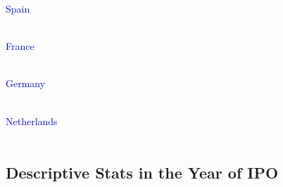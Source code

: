 \documentclass[12pt,notitlepage]{article}
\newcommand{\sym}[1] {\ifmmode^{#1} \else\(^{#1}\) \fi}
\begin{document}
\textcolor{blue}{Spain}\\~\

\begin{table}[htbp]\centering
\def\sym#1{\ifmmode^{#1}\else\(^{#1}\)\fi}
\caption{Haltiwanger growth rate}
\end{table}

\clearpage


\textcolor{blue}{France}\\~\

\begin{table}[htbp]\centering
\def\sym#1{\ifmmode^{#1}\else\(^{#1}\)\fi}
\caption{Haltiwanger growth rate}
\end{table}

\textcolor{blue}{Germany}\\~\

\begin{table}[htbp]\centering
\def\sym#1{\ifmmode^{#1}\else\(^{#1}\)\fi}
\caption{Haltiwanger growth rate}
\end{table}

\clearpage

\textcolor{blue}{Netherlands}\\~\

\begin{table}[htbp]\centering
\def\sym#1{\ifmmode^{#1}\else\(^{#1}\)\fi}
\caption{Haltiwanger growth rate}
\end{table}



\clearpage
\subsection{Descriptive Stats in the Year of IPO}
\end{document}
